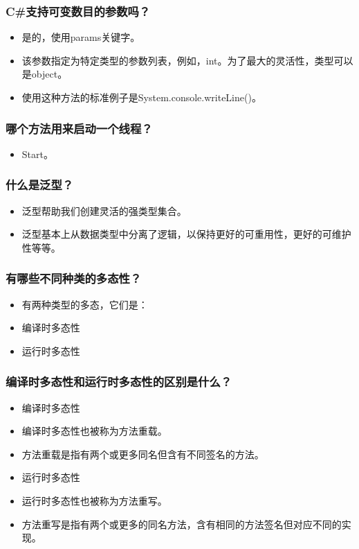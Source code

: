 \documentclass[9pt, b5paper]{article}
\begin{document}
\subsubsection{C\#支持可变数目的参数吗？}
\label{sec-1-2-45}
\begin{itemize}
\item 是的，使用params关键字。
\item 该参数指定为特定类型的参数列表，例如，int。为了最大的灵活性，类型可以是object。
\item 使用这种方法的标准例子是System.console.writeLine()。
\end{itemize}
\subsubsection{哪个方法用来启动一个线程？}
\label{sec-1-2-46}
\begin{itemize}
\item Start。
\end{itemize}
\subsubsection{什么是泛型？}
\label{sec-1-2-47}
\begin{itemize}
\item 泛型帮助我们创建灵活的强类型集合。
\item 泛型基本上从数据类型中分离了逻辑，以保持更好的可重用性，更好的可维护性等等。
\end{itemize}
\subsubsection{有哪些不同种类的多态性？}
\label{sec-1-2-48}
\begin{itemize}
\item 有两种类型的多态，它们是：
\item 编译时多态性
\item 运行时多态性
\end{itemize}
\subsubsection{编译时多态性和运行时多态性的区别是什么？}
\label{sec-1-2-49}
\begin{itemize}
\item 编译时多态性
\item 编译时多态性也被称为方法重载。
\item 方法重载是指有两个或更多同名但含有不同签名的方法。
\item 运行时多态性
\item 运行时多态性也被称为方法重写。
\item 方法重写是指有两个或更多的同名方法，含有相同的方法签名但对应不同的实现。
\end{itemize}
\end{document}
